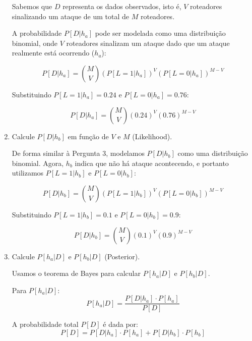 \documentclass[12 pt]{article}
\begin{document}
\begin{enumerate}
    \begin{tcolorbox}[colback=white, colframe=black, title=Resposta:]

Sabemos que \( D \) representa os dados observados, isto é, \( V \) roteadores sinalizando um ataque de um total de \( M \) roteadores.

A probabilidade \( P[D|h_a] \) pode ser modelada como uma distribuição binomial, onde \( V \) roteadores sinalizam um ataque dado que um ataque realmente está ocorrendo (\( h_a \)):

$$
P[D|h_a] = \binom{M}{V} (P[L = 1|h_a])^V (P[L = 0|h_a])^{M-V}
$$

Substituindo \( P[L = 1|h_a] = 0.24 \) e \( P[L = 0|h_a] = 0.76 \):

$$
P[D|h_a] = \binom{M}{V} (0.24)^V (0.76)^{M-V}
$$

\end{tcolorbox}
\newpage

    \item Calcule $P[D|h_b]$ em função de $V$ e $M$ (Likelihood).
    
    \begin{tcolorbox}[colback=white, colframe=black, title=Resposta:]

De forma similar à Pergunta 3, modelamos \( P[D|h_b] \) como uma distribuição binomial. Agora, \( h_b \) indica que não há ataque acontecendo, e portanto utilizamos \( P[L = 1|h_b] \) e \( P[L = 0|h_b] \):

$$
P[D|h_b] = \binom{M}{V} (P[L = 1|h_b])^V (P[L = 0|h_b])^{M-V}
$$

Substituindo \( P[L = 1|h_b] = 0.1 \) e \( P[L = 0|h_b] = 0.9 \):

$$
P[D|h_b] = \binom{M}{V} (0.1)^V (0.9)^{M-V}
$$


\end{tcolorbox}

    \item Calcule $P[h_a|D]$ e $P[h_b|D]$ (Posterior).
    
    \begin{tcolorbox}[colback=white, colframe=black, title=Resposta:]

    Usamos o teorema de Bayes para calcular \( P[h_a|D] \) e \( P[h_b|D] \).
    
    Para \( P[h_a|D] \):
    $$
    P[h_a|D] = \frac{P[D|h_a] \cdot P[h_a]}{P[D]}
    $$
    
    A probabilidade total \( P[D] \) é dada por:
    $$
    P[D] = P[D|h_a] \cdot P[h_a] + P[D|h_b] \cdot P[h_b]
    $$
    

\end{tcolorbox}
\end{enumerate}
\end{document}
